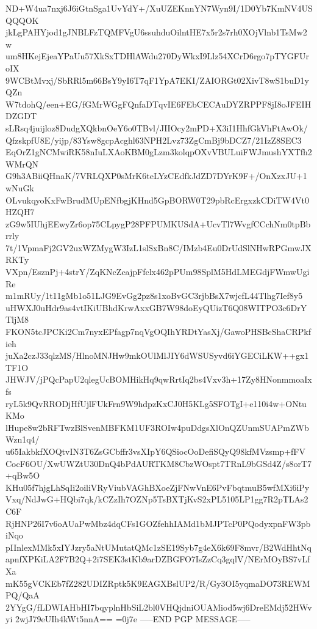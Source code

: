 ND+W4ua7nxj6J6iGtnSga1UvYdY+/XuUZEKnnYN7Wyn9I/1D0Yb7KmNV4USQQQOK
jkLgPAHYjod1gJNBLFzTQMFVgU6ssuhduOilntHE7x5r2s7rh0XOjVlnb1TsMw2w
um8HKejEjeaYPaUu57XkSxTDHlAWdu270DyWkxI9Llz54XCrD6rgo7pTYGFUroIX
9WCBtMvxj/SbRRl5m66BsY9yI6T7qF1YpA7EKI/ZAIORGt02XivT8wS1buD1yQZn
W7tdohQ/een+EG/fGMrWGgFQnfaDTqvIE6FEbCECAuDYZRPPF8jI8oJFEIHDZGDT
sLRsq4juijloz8DudgXQkbnOeY6o0TBvl/JIIOcy2mPD+X3iI1HhfGkVhFtAwOk/
QfzskpfU8E/yijp/83Ysw8gcpAcghl63NPH2Lvz73ZgCmBj9bDCZ7/21IzZ8SEC3
EqOrZ1gNCMwiRK58nIuLXAoKBM0gLzm3kolqpOXvVBULuiFWJmushYXTfh2WMrQN
G9h3ABiiQHnaK/7VRLQXP0sMrK6teLYzCEdfkJdZD7DYrK9F+/OnXzxJU+1wNuGk
OLvukqyoKxFwBrudMUpENfbgjKHnd5GpBORW0T29pbRcErgxzkCDiTW4Vt0HZQH7
zG9w5IUhjEEwyZr6op75CLpygP28PFPUMKUSdA+UcvTl7WvgfCCchNm0tpBbrrly
7t/1VpmaFj2GV2uxWZMygW3IzL1slSxBn8C/IMzb4Eu0DrUdSlNHwRPGmwJXRKTy
VXpn/EsznPj+4strY/ZqKNcZcajpFfclx462pPUm98SplM5HdLMEGdjFWmwUgiRe
m1mRUy/1t11gMb1o51LJG9EvGg2pz8s1xoBvGC3rjbBsX7wjcfL44Tlhg7Ief8y5
uHWXJ0uHdr9as4vtIKiUBhdKrwAxxGB7W98doEyQUizT6Q08WITPO3c6DrYTljM8
FKON5tcJPCKi2Cm7nyxEPfagp7nqVgOQIhYRDtYasXj/GawoPHSBcShaCRPkfieh
juXa2czJ33qlzMS/HlnoMNJHw9mkOUlMlJIY6dWSUSyvd6iYGECiLKW++gx1TF1O
JHWJV/jPQcPapU2qlegUcBOMHikHq9qwRrtIq2bs4Vxv3h+17Zy8HNonmmoaIxfs
ryL5k9QvRRODjHfUjlFUkFrn9W9hdpzKxCJ0H5KLg5SFOTgI+e110i4w+ONtuKMo
lHupe8w2bRFTwzBlSvenMBFKM1UF3ROIw4puDdgsXlOnQZUnmSUAPmZWbWzn1q4/
u65IakbkfXOQtvIN3T6ZsGCbffr3vsXIpY6QSiocOoDefiSQyQ98kfMVzsmp+fFV
CocF6OU/XwUWZtU30DnQ4bPdAURTKM8CbzWOspt7TRnL9bGSd4Z/s8orT7+qBw5O
KHu05f7hjgLhSqIi2oiliVRyViubVAGhBXoeZjFNwVnE6PvFbqtmuB5wfMXi6iPy
Vxq/NdJwG+HQbi7qk/kCZzIh7OZNp5TsBXTjKvS2xPL5105LP1gg7R2pTLAs2C6F
RjHNP26I7v6oAUaPwMbz4dqCFs1GOZfehhIAMd1bMJPTcP0PQodyxpnFW3pbiNqo
pIInlexMMk5xIYJzry5aNtUMutatQMc1zSE19Syb7g4eX6k69F8mvr/B2WdHhtNq
apnfXPKiLA2F7B2Q+2i7SEK3stKb9arDZBGFO7IsZzCq3gqlV/NErMOyBS7vLfXa
mK55gVCKEb7fZ282UDIZRptk5K9EAGXBslUP2/R/Gy3OI5yqmaDO73REWMPQ/QaA
2YYgG/fLDWIAHbHI7bqyplnHbSiL2bl0VHQjdniOUAMiod5wj6DreEMdj52HWvyi
2wjJ79eUIh4kWt5nnA==
=0j7e
-----END PGP MESSAGE-----
